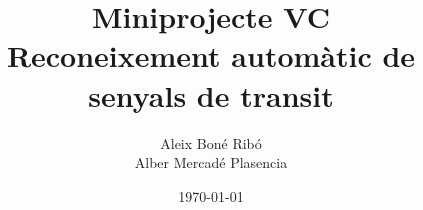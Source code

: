 



\usepackage{pdfpages}

\title{Miniprojecte VC\\ \Large \normalfont Reconeixement automàtic de senyals
de transit}
\author{Aleix Bon\'e Rib\'o\\ Alber Mercad\'e Plasencia}
\date{\today}




    



    \tableofcontents \pagebreak



    \setlength{\parskip}{1em plus 0.5em minus 0.2em}


    
    
    
    
    
    
    



    \appendix

    


